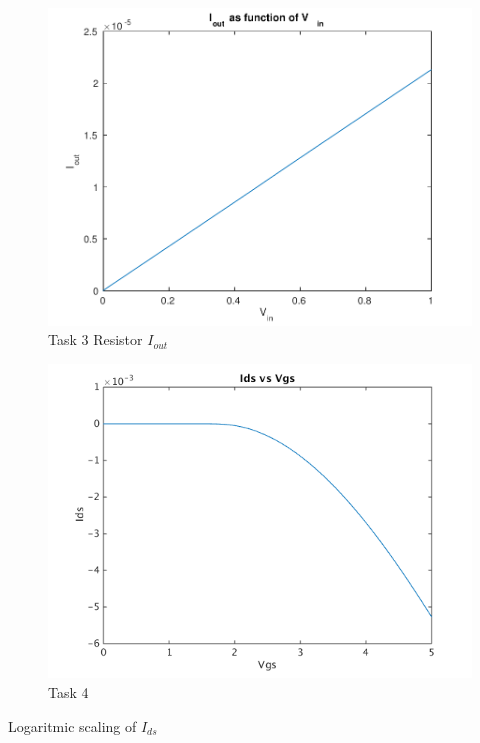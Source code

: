 \documentclass[11pt,a4paper]{report}
\begin{document}
\begin{figure}[ht!]
\caption{Task 3 Resistor $I_{out}$}
\centering
\includegraphics[scale=1]{task3-eps-converted-to.pdf}
\end{figure}
\begin{figure}[ht!]
\caption{Task 4}
\centering
\includegraphics[scale=1]{task4-lin.png}
\end{figure}
Logaritmic scaling of $I_{ds}$
\end{document}
